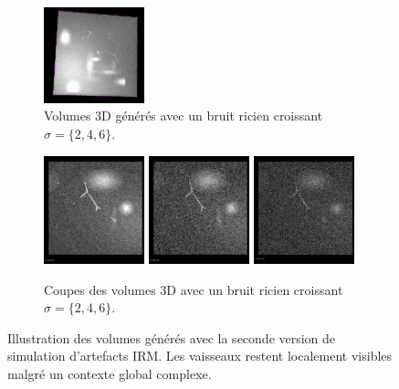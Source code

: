 \begin{figure}
\begin{subfigure}{\textwidth}
  \includegraphics[width=0.32\textwidth]{Images/gen_vascu_V2_r6.png}
  \caption{Volumes 3D générés avec un bruit ricien croissant $\sigma=\{2, 4, 6\}$.}
\end{subfigure}
\begin{subfigure}{\textwidth}
  \includegraphics[width=0.32\textwidth]{Images/gen_vascu_V2_r2_2D.png}
  \includegraphics[width=0.32\textwidth]{Images/gen_vascu_V2_r4_2D.png}
  \includegraphics[width=0.32\textwidth]{Images/gen_vascu_V2_r6_2D.png}
  \caption{Coupes des volumes 3D avec un bruit ricien croissant $\sigma=\{2, 4, 6\}$.}
\end{subfigure}
\caption{Illustration des volumes générés avec la seconde version de simulation d'artefacts IRM. Les vaisseaux restent localement visibles malgré un contexte global complexe.}
\label{fig:vascuSynth_results_V2}
\end{figure}
 
